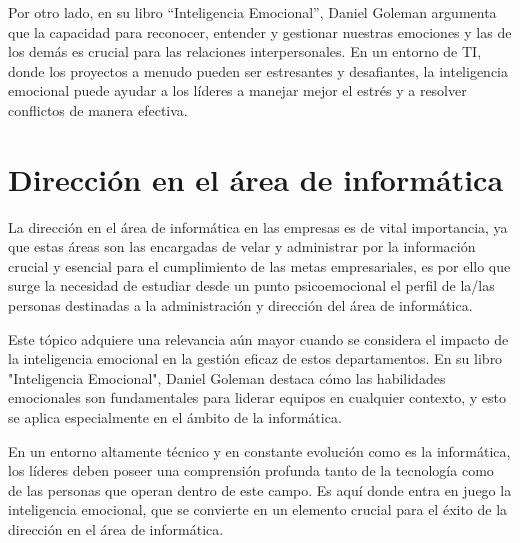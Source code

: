 \documentclass[journal]{IEEEtran}
\begin{document}
Por otro lado, en su libro “Inteligencia Emocional”, Daniel Goleman argumenta que la capacidad para reconocer, entender y gestionar nuestras emociones y las de los demás es crucial para las relaciones interpersonales. En un entorno de TI, donde los proyectos a menudo pueden ser estresantes y desafiantes, la inteligencia emocional puede ayudar a los líderes a manejar mejor el estrés y a resolver conflictos de manera efectiva.


\section{Dirección en el área de informática}
La dirección en el área de informática en las empresas es de vital importancia, ya que estas áreas son las encargadas de velar y administrar por la información crucial y esencial para el cumplimiento de las metas empresariales, es por ello que surge la necesidad de estudiar desde un punto psicoemocional el perfil de la/las personas destinadas a la administración y dirección del área de informática.

Este tópico adquiere una relevancia aún mayor cuando se considera el impacto de la inteligencia emocional en la gestión eficaz de estos departamentos. En su libro "Inteligencia Emocional", Daniel Goleman destaca cómo las habilidades emocionales son fundamentales para liderar equipos en cualquier contexto, y esto se aplica especialmente en el ámbito de la informática.

En un entorno altamente técnico y en constante evolución como es la informática, los líderes deben poseer una comprensión profunda tanto de la tecnología como de las personas que operan dentro de este campo. Es aquí donde entra en juego la inteligencia emocional, que se convierte en un elemento crucial para el éxito de la dirección en el área de informática.
\end{document}
